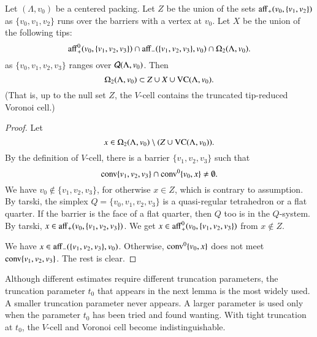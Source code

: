 \begin{lemma} 
Let $(\Lambda,v_0)$ be a centered packing.  Let $Z$ be the union
of the sets ${\operatorname{aff}}_+(v_0,\{v_1,v_2\})$ as $\{v_0,v_1,v_2\}$
runs over the barriers with a vertex at $v_0$.  Let $X$ be the
union of the following tips:
   $$
   {\operatorname{aff}}_+^0(v_0,\{v_1,v_2,v_3\}) \cap {\operatorname{aff}}_-
   (\{v_1,v_2,v_3\},v_0)\cap \Omega_2(\Lambda,v_0).
   $$
as $\{v_0,v_1,v_2,v_3\}$ ranges over ${\mathcal Q}(\Lambda,v_0)$.
Then 
$$\Omega_2(\Lambda,v_0)
 \subset Z\cup X\cup {\operatorname{VC}}(\Lambda,v_0).$$
(That is, up to the null set $Z$, the $V$-cell contains
the truncated tip-reduced Voronoi cell.)
\end{lemma}

\begin{proof}  Let 
 $$x \in \Omega_2(\Lambda,v_0)
 \setminus (Z\cup{\operatorname{VC}}(\Lambda,v_0)).
 $$
By
the definition of $V$-cell, there is a barrier $\{v_1,v_2,v_3\}$
such that
  $${\operatorname{conv}}\{v_1,v_2,v_3\}\cap {\operatorname{conv}}^0\{v_0,x\}\ne\emptyset.$$ 
We have $v_0\not\in\{v_1,v_2,v_3\}$, for otherwise $x\in Z$, 
which is contrary to assumption. 
By tarski,
the simplex $Q=\{v_0,v_1,v_2,v_3\}$ is a quasi-regular tetrahedron
or a flat quarter.  If the barrier is the face of a flat quarter,
then $Q$ too is in
the $Q$-system.  By tarski,  $x\in{\operatorname{aff}}_+(v_0,\{v_1,v_2,v_3\})$.  
We get $x\in{\operatorname{aff}}_+^0(v_0,\{v_1,v_2,v_3\})$ from $x\not\in Z$.

We have $x\in{\operatorname{aff}}_-
   (\{v_1,v_2,v_3\},v_0)$. Otherwise, ${\operatorname{conv}}^0\{v_0,x\}$ does
not meet ${\operatorname{conv}}\{v_1,v_2,v_3\}$.
The rest is clear.
\end{proof}

Although different estimates require different
truncation parameters, the truncation parameter $t_0$ that appears in
the next lemma is the most widely used.  A smaller truncation parameter never
appears.  A larger parameter is used only when the parameter $t_0$
has been tried and found wanting.  With tight truncation at $t_0$,
 the $V$-cell and Voronoi cell become
indistinguishable.


